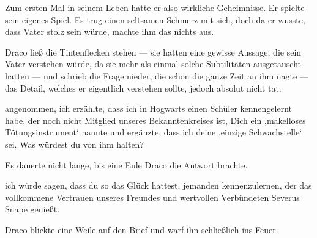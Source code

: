 Zum ersten Mal in seinem Leben hatte er also wirkliche Geheimnisse. Er spielte sein eigenes Spiel. Es trug einen seltsamen Schmerz mit sich, doch da er wusste, dass Vater stolz sein würde, machte ihm das nichts aus.

Draco ließ die Tintenflecken stehen — sie hatten eine gewisse Aussage, die sein Vater verstehen würde, da sie mehr als einmal solche Subtilitäten ausgetauscht hatten — und schrieb die Frage nieder, die schon die ganze Zeit an ihm nagte — das Detail, welches er eigentlich verstehen sollte, jedoch absolut nicht tat.

\begin{writtenNote}

angenommen, ich erzählte, dass ich in Hogwarts einen Schüler kennengelernt habe, der noch nicht Mitglied unseres Bekanntenkreises ist, Dich ein ‚makelloses Tötungsinstrument‘ nannte und ergänzte, dass ich deine ‚einzige Schwachstelle‘ sei. Was würdest du von ihm halten?
\end{writtenNote}

Es dauerte nicht lange, bis eine Eule Draco die Antwort brachte.

\begin{writtenNote}

ich würde sagen, dass du so das Glück hattest, jemanden kennenzulernen, der das vollkommene Vertrauen unseres Freundes und wertvollen Verbündeten Severus Snape genießt.
\end{writtenNote}

Draco blickte eine Weile auf den Brief und warf ihn schließlich ins Feuer.

